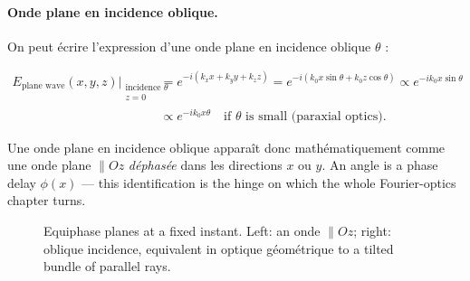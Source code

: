 \paragraph{Onde plane en incidence oblique.} On peut écrire l'expression d'une
onde plane en incidence oblique $\theta$ :

\begin{align*}
  E_{\text{plane wave}}(x,y,z)\Big|_{\substack{\text{incidence }\theta\\ z=0}}
  &=e^{-i(k_xx+k_yy+k_zz)}=e^{-i(k_0x\sin\theta+k_0z\cos\theta)}
  \propto e^{-ik_0x\sin\theta}\\
  &\propto e^{-ik_0x\theta}\quad\text{if }\theta\text{ is small (paraxial optics)}.
\end{align*}

\begin{conclusion}
  Une onde plane en incidence oblique apparaît donc mathématiquement comme une
  onde plane $\parallel Oz$ \emph{déphasée} dans les directions $x$ ou $y$. An
  angle is a phase delay $\phi(x)$ --- this identification is the hinge on which
  the whole Fourier-optics chapter turns.
\end{conclusion}

\begin{figure}[h!]
  \centering
  \caption*{\small Equiphase planes at a fixed instant. Left: an onde
  $\parallel Oz$; right: oblique incidence, equivalent in optique géométrique to
  a tilted bundle of parallel rays.}
\end{figure}

